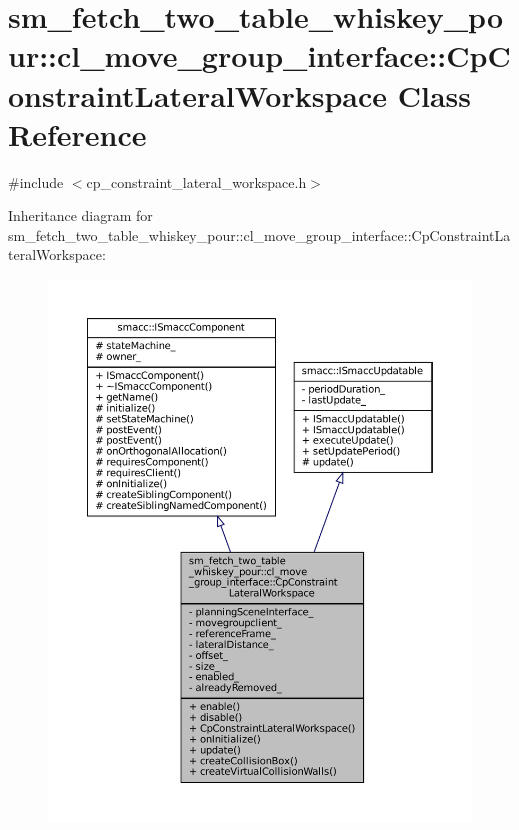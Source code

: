 \hypertarget{classsm__fetch__two__table__whiskey__pour_1_1cl__move__group__interface_1_1CpConstraintLateralWorkspace}{}\section{sm\+\_\+fetch\+\_\+two\+\_\+table\+\_\+whiskey\+\_\+pour\+:\+:cl\+\_\+move\+\_\+group\+\_\+interface\+:\+:Cp\+Constraint\+Lateral\+Workspace Class Reference}
\label{classsm__fetch__two__table__whiskey__pour_1_1cl__move__group__interface_1_1CpConstraintLateralWorkspace}


{\ttfamily \#include $<$cp\+\_\+constraint\+\_\+lateral\+\_\+workspace.\+h$>$}



Inheritance diagram for sm\+\_\+fetch\+\_\+two\+\_\+table\+\_\+whiskey\+\_\+pour\+:\+:cl\+\_\+move\+\_\+group\+\_\+interface\+:\+:Cp\+Constraint\+Lateral\+Workspace\+:
\nopagebreak
\begin{figure}[H]
\begin{center}
\leavevmode
\includegraphics[width=350pt]{classsm__fetch__two__table__whiskey__pour_1_1cl__move__group__interface_1_1CpConstraintLateralWorkspace__inherit__graph}
\end{center}
\end{figure}


